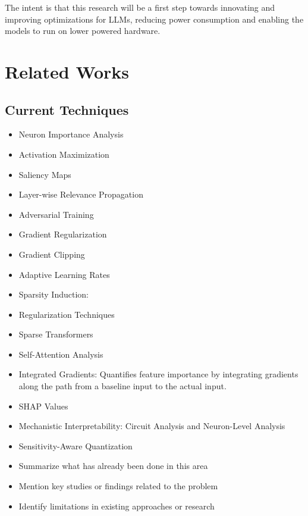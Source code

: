 \documentclass{article}
\begin{document}
The intent is that this research will be a first step towards innovating and improving optimizations for LLMs, reducing power consumption and enabling the models to run on lower powered hardware.

\section*{Related Works}
\subsection*{Current Techniques}
\begin{itemize}
    \item Neuron Importance Analysis
    \item Activation Maximization
    \item Saliency Maps
    \item Layer-wise Relevance Propagation
    \item Adversarial Training
    \item Gradient Regularization
    \item Gradient Clipping
    \item Adaptive Learning Rates
    \item Sparsity Induction:
    \item Regularization Techniques
    \item Sparse Transformers
    \item Self-Attention Analysis
    \item Integrated Gradients: Quantifies feature importance by integrating gradients along the path from a baseline input to the actual input.
    \item SHAP Values
    \item Mechanistic Interpretability: Circuit Analysis and Neuron-Level Analysis
    \item Sensitivity-Aware Quantization
















\end{itemize}

\begin{itemize}
    \item Summarize what has already been done in this area
    \item Mention key studies or findings related to the problem
    \item Identify limitations in existing approaches or research
\end{itemize}
\end{document}
